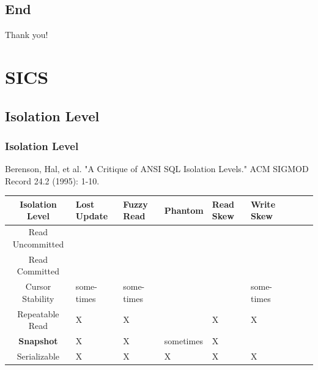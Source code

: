 \documentclass{beamer}
\begin{document}
\subsection{End}
\begin{frame}
\Huge{\centerline{Thank you!}}
\end{frame}


\section{SICS}
\subsection{Isolation Level}
\begin{frame}
	\frametitle{Isolation Level}
	Berenson, Hal, et al. "A Critique of ANSI SQL Isolation Levels." ACM SIGMOD Record 24.2 (1995): 1-10.
\begin{table}[h]
	\centering
	\begin{tabular}{|c|p{1cm}|p{1cm}|p{1.5cm}|p{1cm}|p{1cm}|p{2cm}|p{1cm}|p{1cm}|}
		\hline
		\textbf{Isolation Level} &  \textbf{Lost Update} & \textbf{Fuzzy Read} & \textbf{Phantom} & \textbf{Read Skew} & \textbf{Write Skew} \\ \hline
		Read Uncommitted         &  \checkmark           & \checkmark          & \checkmark       & \checkmark         & \checkmark          \\ \hline
		Read Committed           &  \checkmark           & \checkmark          & \checkmark       & \checkmark         & \checkmark          \\ \hline
		Cursor Stability         &  some- times            & some- times           & \checkmark       & \checkmark         & some- times           \\ \hline
		Repeatable Read          & X                    & X                   & \checkmark       & X                  & X                   \\ \hline
		\textbf{Snapshot}                 & X                    & X                   & sometimes        & X                  & \checkmark          \\ \hline
		Serializable             & X                    & X                   & X                & X                  & X                   \\ \hline
	\end{tabular}
\end{table}
\end{frame}
\end{document}

